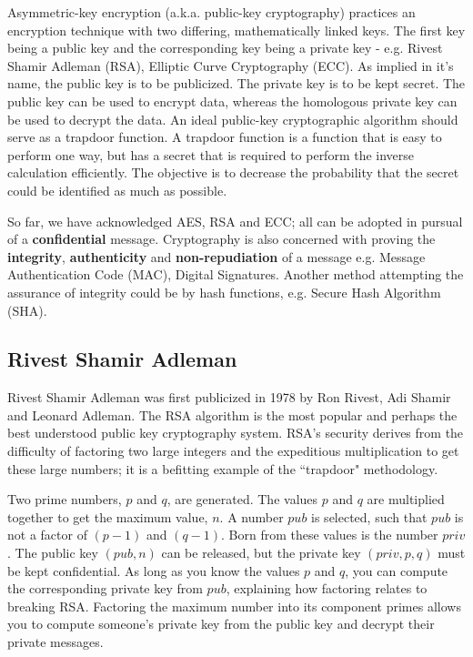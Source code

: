 Asymmetric-key encryption (a.k.a. public-key cryptography) practices an encryption technique with two differing, mathematically linked keys. The first key being a public key and the corresponding key being a private key  - e.g. Rivest Shamir Adleman (RSA), Elliptic Curve Cryptography (ECC). As implied in it's name, the public key is to be publicized. The private key is to be kept secret. The public key can be used to encrypt data, whereas the homologous private key can be used to decrypt the data. An ideal public-key cryptographic algorithm should serve as a trapdoor function. A trapdoor function is a function that is easy to perform one way, but has a secret that is required to perform the inverse calculation efficiently. The objective is to decrease the probability that the secret could be identified as much as possible.

So far, we have acknowledged AES, RSA and ECC; all can be adopted in pursual of a \textbf{confidential} message. Cryptography is also concerned with proving the \textbf{integrity}, \textbf{authenticity} and \textbf{non-repudiation} of a message e.g. Message Authentication Code (MAC), Digital Signatures. Another method attempting the assurance of integrity could be by hash functions, e.g. Secure Hash Algorithm (SHA).

\subsection{Rivest Shamir Adleman}
 Rivest Shamir Adleman was first publicized in 1978 by Ron Rivest, Adi Shamir and Leonard Adleman. The RSA algorithm is the most popular and  perhaps the best understood public key cryptography system. RSA's security derives from the difficulty of factoring two large integers and the expeditious multiplication to get these large numbers; it is a befitting example of the ``trapdoor" methodology. 
 
 Two prime numbers, \(p\) and \(q\), are generated. The values \(p\) and \(q\) are multiplied together to get the maximum value, \(n\). 
 A number \(pub\) is selected, such that \(pub\) is not a factor of \((p - 1)\) and \((q - 1)\). %
 Born from these values is the number \(priv\).
 The public key \((pub,n)\) can be released, but the private key \((priv,p,q)\) must be kept confidential.
 As long as you know the values \(p\) and \(q\), you can compute the corresponding private key from \(pub\), explaining how factoring relates to breaking RSA. Factoring the maximum number into its component primes allows you to compute someone's private key from the public key and decrypt their private messages.

